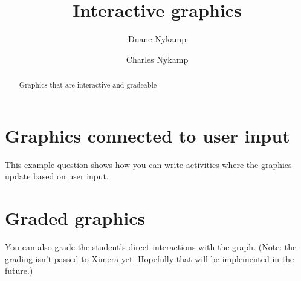 \documentclass{ximera}
\title{Interactive graphics}
\author{Duane Nykamp \and Charles Nykamp}
\begin{document}
\begin{abstract}
  Graphics that are interactive and gradeable
\end{abstract}
\maketitle
\label{xim:doenetDemo}

\section{Graphics connected to user input}
This example question shows how you can write activities where the graphics update based on user input.


\section{Graded graphics}
You can also grade the student's direct interactions with the graph. (Note: the grading isn't passed to Ximera yet. Hopefully that will be implemented in the future.)

\end{document}
